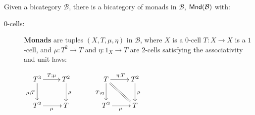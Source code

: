 \begin{definition}
\label{def:monad}
Given a bicategory $\mathcal B$, there is a bicategory of monads in $\mathcal B$, ${\sf Mnd}({\mathcal B})$ with:
\begin{description}
\item[0-cells:]
{\bf Monads} are tuples $(X,T,\mu,\eta)$ in $\mathcal B$, where $X$ is a $0$-cell $T:X\to X$ is a $1$-cell,  and  $\mu:T^2 \to T$ and $\eta:1_X\to T$ are $2$-cells satisfying the associativity and unit laws:

\hfil$
\xymatrix{
T^3 \ar[r]^{T;\mu} \ar[d]_{\mu; T}
  & T^2 \ar[d]^\mu\\
T^2\ar[r]_{\mu} & T
}
\hspace*{1cm}
\xymatrix{
T \ar[r]^{\eta; T} \ar[d]_{ T;\eta} \ar@{=}[dr] & T^2 \ar[d]^\mu\\
T^2 \ar[r]_{\mu} & T
}
$


\end{description}
\end{definition}

